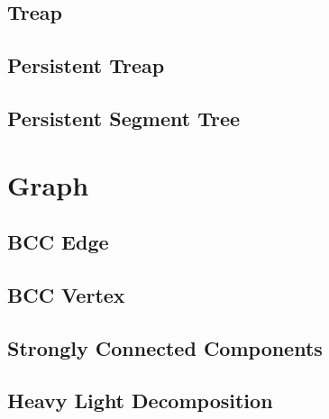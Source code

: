 \documentclass[a4paper,10pt,twocolumn,oneside]{article}
\begin{document}
\subsection{Treap}


\subsection{Persistent Treap}


\subsection{Persistent Segment Tree}


\section{Graph}

\subsection{BCC Edge}


\subsection{BCC Vertex}


\subsection{Strongly Connected Components}


\subsection{Heavy Light Decomposition}


%

%
\end{document}
